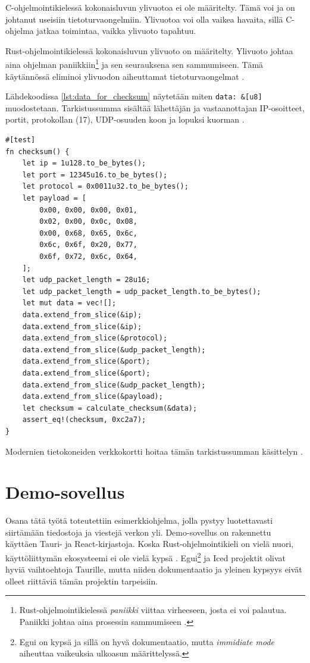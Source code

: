 \documentclass[a4paper,12pt]{article}
\begin{document}
    C-ohjelmointikielessä kokonaisluvun ylivuotoa ei ole määritelty. Tämä voi ja on johtanut useisiin tietoturvaongelmiin. Ylivuotoa voi olla vaikea havaita, sillä C-ohjelma jatkaa toimintaa, vaikka ylivuoto tapahtuu.\par
    Rust-ohjelmointikielessä kokonaisluvun ylivuoto on määritelty. Ylivuoto johtaa aina ohjelman paniikkiin\footnote{Rust-ohjelmointikielessä \textit{paniikki} viittaa virheeseen, josta ei voi palautua. Paniikki johtaa aina prosessin sammumiseen \cite[luku 9.3]{rust-book}.} ja sen seurauksena sen sammumiseen. Tämä käytännössä eliminoi ylivuodon aiheuttamat tietoturvaongelmat \cite[luku 3.2]{rust-book}.

    Lähdekoodissa \ref{lst:data_for_checksum} näytetään miten \lstinline{data: &[u8]} muodostetaan. Tarkistussumma sisältää lähettäjän ja vastaanottajan IP-osoitteet, portit, protokollan (17), UDP-osuuden koon ja lopuksi kuorman \cite{RFC-768, protocol-numbers}. \par

        \begin{lstlisting}[caption={Tietojen kasaaminen tarkistussummaa varten}, label={lst:data_for_checksum}]
#[test]
fn checksum() {
    let ip = 1u128.to_be_bytes();
    let port = 12345u16.to_be_bytes();
    let protocol = 0x0011u32.to_be_bytes();
    let payload = [
        0x00, 0x00, 0x00, 0x01,
        0x02, 0x00, 0x0c, 0x08,
        0x00, 0x68, 0x65, 0x6c,
        0x6c, 0x6f, 0x20, 0x77,
        0x6f, 0x72, 0x6c, 0x64,
    ];
    let udp_packet_length = 28u16;
    let udp_packet_length = udp_packet_length.to_be_bytes();
    let mut data = vec![];
    data.extend_from_slice(&ip);
    data.extend_from_slice(&ip);
    data.extend_from_slice(&protocol);
    data.extend_from_slice(&udp_packet_length);
    data.extend_from_slice(&port);
    data.extend_from_slice(&port);
    data.extend_from_slice(&udp_packet_length);
    data.extend_from_slice(&payload);
    let checksum = calculate_checksum(&data);
    assert_eq!(checksum, 0xc2a7);
}
        \end{lstlisting}

    Modernien tietokoneiden verkkokortti hoitaa tämän tarkistussumman käsittelyn \cite{VivianoTCP/IPLearn}.


    \section{Demo-sovellus}\label{sec:demo}

    Osana tätä työtä toteutettiin esimerkkiohjelma, jolla pystyy luotettavasti siirtämään tiedostoja ja viestejä verkon yli. Demo-sovellus on rakennettu käyttäen Tauri- ja React-kirjastoja. Koska Rust-ohjelmointikieli on vielä nuori, käyttöliittymän ekosysteemi ei ole vielä kypsä \cite{AreYet}. 
    Egui\footnote{Egui on kypsä ja sillä on hyvä dokumentaatio, mutta \textit{immidiate mode} aiheuttaa vaikeuksia ulkoasun määrittelyssä. } ja Iced projektit olivat hyviä vaihtoehtoja Taurille, mutta niiden dokumentaatio ja yleinen kypsyys eivät olleet riittäviä tämän projektin tarpeisiin. \par
\end{document}
